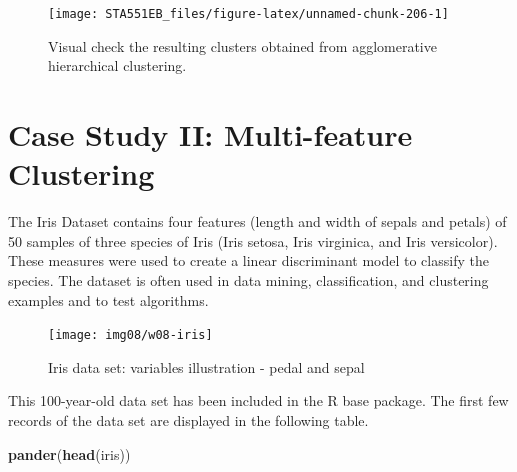 \documentclass[
]{book}
\newenvironment{Shaded}{\begin{snugshade}}{\end{snugshade}}
\newcommand{\FunctionTok}[1]{\textcolor[rgb]{0.13,0.29,0.53}{\textbf{#1}}}
\newcommand{\NormalTok}[1]{#1}
\begin{document}
\begin{figure}

{\centering \texttt{[image: STA551EB\_files/figure-latex/unnamed-chunk-206-1]} 

}

\caption{Visual check the resulting clusters obtained from agglomerative hierarchical clustering.}\label{fig:unnamed-chunk-206}
\end{figure}

\hfill\break

\hypertarget{case-study-ii-multi-feature-clustering}{%
\section{Case Study II: Multi-feature Clustering}\label{case-study-ii-multi-feature-clustering}}

The Iris Dataset contains four features (length and width of sepals and petals) of 50 samples of three species of Iris (Iris setosa, Iris virginica, and Iris versicolor). These measures were used to create a linear discriminant model to classify the species. The dataset is often used in data mining, classification, and clustering examples and to test algorithms.

\begin{figure}

{\centering \texttt{[image: img08/w08-iris]} 

}

\caption{Iris data set: variables illustration - pedal and sepal}\label{fig:unnamed-chunk-207}
\end{figure}

This 100-year-old data set has been included in the R base package. The first few records of the data set are displayed in the following table.

\begin{Shaded}
\begin{Highlighting}[]
\FunctionTok{pander}\NormalTok{(}\FunctionTok{head}\NormalTok{(iris))}
\end{Highlighting}
\end{Shaded}
\end{document}
